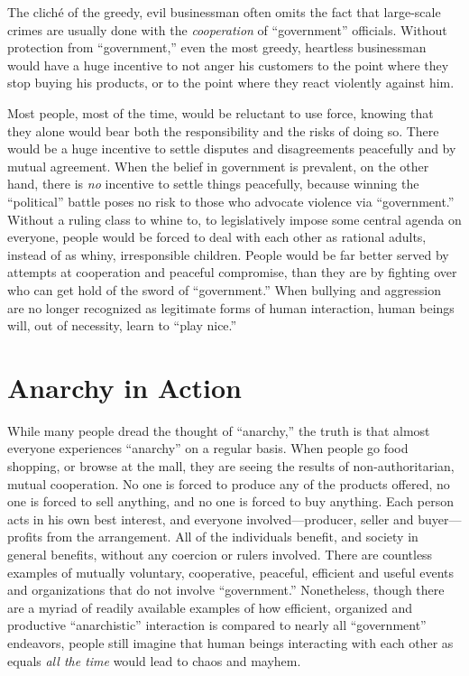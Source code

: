 \documentclass{book}
\begin{document}
The cliché of the greedy, evil businessman often omits the fact that large-scale crimes are usually done with the \emph{cooperation} of \enquote{government} officials. Without protection from \enquote{government,} even the most greedy, heartless businessman would have a huge incentive to not anger his customers to the point where they stop buying his products, or to the point where they react violently against him.

Most people, most of the time, would be reluctant to use force, knowing that they alone would bear both the responsibility and the risks of doing so. There would be a huge incentive to settle disputes and disagreements peacefully and by mutual agreement. When the belief in government is prevalent, on the other hand, there is \emph{no} incentive to settle things peacefully, because winning the \enquote{political} battle poses no risk to those who advocate violence via \enquote{government.} Without a ruling class to whine to, to legislatively impose some central agenda on everyone, people would be forced to deal with each other as rational adults, instead of as whiny, irresponsible children. People would be far better served by attempts at cooperation and peaceful compromise, than they are by fighting over who can get hold of the sword of \enquote{government.} When bullying and aggression are no longer recognized as legitimate forms of human interaction, human beings will, out of necessity, learn to \enquote{play nice.}

\section{Anarchy in Action}

While many people dread the thought of \enquote{anarchy,} the truth is that almost everyone experiences \enquote{anarchy} on a regular basis. When people go food shopping, or browse at the mall, they are seeing the results of non-authoritarian, mutual cooperation. No one is forced to produce any of the products offered, no one is forced to sell anything, and no one is forced to buy anything. Each person acts in his own best interest, and everyone involved---producer, seller and buyer---profits from the arrangement. All of the individuals benefit, and society in general benefits, without any coercion or rulers involved. There are countless examples of mutually voluntary, cooperative, peaceful, efficient and useful events and organizations that do not involve \enquote{government.} Nonetheless, though there are a myriad of readily available examples of how efficient, organized and productive \enquote{anarchistic} interaction is compared to nearly all \enquote{government} endeavors, people still imagine that human beings interacting with each other as equals \emph{all the time} would lead to chaos and mayhem.
\end{document}
